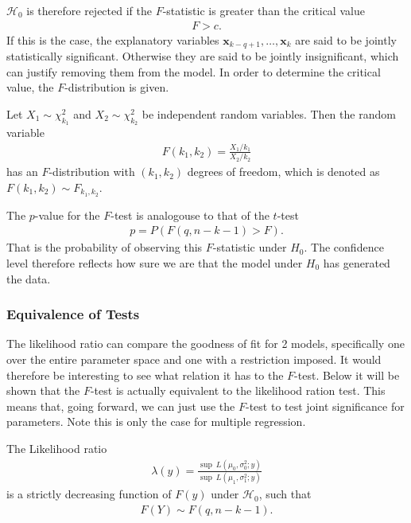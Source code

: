 $\mathcal{H}_0$ is therefore rejected if the $F$-statistic is greater than the critical value
\begin{align*}
    F>c.
\end{align*}
If this is the case, the explanatory variables $\textbf{x}_{k-q+1}, \ldots, \textbf{x}_k$ are said to be jointly statistically significant. 
Otherwise they are said to be jointly insignificant, which can justify removing them from the model. 
In order to determine the critical value, the $F$-distribution is given.
\begin{definition}[$F$-Distribution]\label{def:F-distribution}
    Let $X_1 \sim \chi_{k_1}^2$ and $X_2 \sim \chi_{k_2}^2$ be independent random variables. Then the random variable 
        \begin{align*}
            F(k_1,k_2) = \frac{X_1/k_1}{X_2/k_2}
        \end{align*}
    has an $F$-distribution with $(k_1, k_2)$ degrees of freedom, which is denoted as $F(k_1,k_2) \sim F_{k_1, k_2}$.
\end{definition}
The $p$-value for the $F$-test is analogouse to that of the $t$-test
\begin{align*}
    p = P(F(q,n-k-1) > F).
\end{align*}
That is the probability of observing this $F$-statistic under $H_0$. 
The confidence level therefore reflects how sure we are that the model under $H_0$ has generated the data.

\subsubsection{Equivalence of Tests}

The likelihood ratio can compare the goodness of fit for 2 models, specifically one over the entire parameter space and one with a restriction imposed.
It would therefore be interesting to see what relation it has to the $F$-test. 
Below it will be shown that the $F$-test is actually equivalent to the likelihood ration test.
This means that, going forward, we can just use the $F$-test to test joint significance for parameters.
Note this is only the case for multiple regression. 

\begin{theorem}
\label{th:Likelihood_ratio_linear_models}
    The Likelihood ratio
    \begin{align*}
        \lambda(y) = \frac{\sup \ L(\mu_0, \sigma_0^2; y)}{\sup \ L(\mu_1, \sigma_1^2; y)}
    \end{align*}
    is a strictly decreasing function of $F(y)$ under $\mathcal{H}_0$, such that
    \begin{align*}
        F(Y) \sim F(q, n-k-1).
    \end{align*}
\end{theorem}

